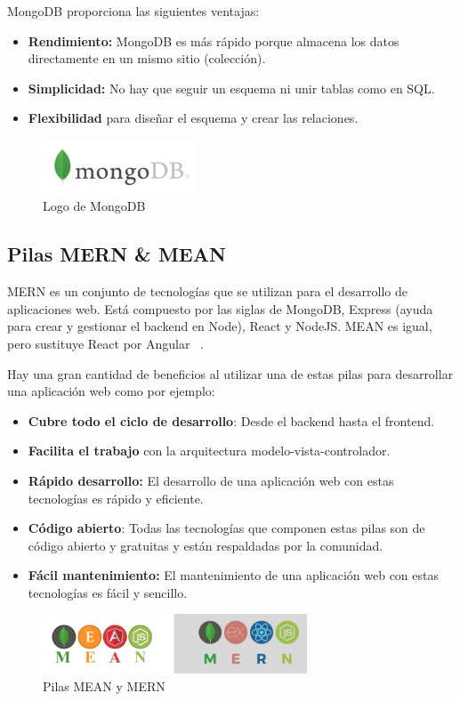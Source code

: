 MongoDB proporciona las siguientes ventajas:
\begin{itemize}
\item \textbf{Rendimiento:} MongoDB es más rápido porque almacena los datos directamente en un mismo sitio (colección).
\item \textbf{Simplicidad:} No hay que seguir un esquema ni unir tablas como en SQL.
\item  \textbf{Flexibilidad} para diseñar el esquema y crear las relaciones.
\end{itemize}
\begin{figure}[H]
    \centering
    \includegraphics[width=0.4\textwidth]{imagenes/c2/mongodb.png}
    \caption{Logo de MongoDB}
\end{figure}

\subsection{Pilas MERN \& MEAN}
MERN es un conjunto de tecnologías que se utilizan para el desarrollo de aplicaciones web. Está compuesto por las siglas de MongoDB, Express (ayuda para crear y gestionar el backend en Node), React y NodeJS. MEAN es igual, pero sustituye React por
Angular ~\cite{mern}.

Hay una gran cantidad de beneficios al utilizar una de estas pilas para desarrollar una aplicación web como por ejemplo:
\begin{itemize}
\item \textbf{Cubre todo el ciclo de desarrollo}: Desde el backend hasta el frontend.
\item \textbf{Facilita el trabajo} con la arquitectura modelo-vista-controlador.
\item \textbf{Rápido desarrollo:} El desarrollo de una aplicación web con estas tecnologías es rápido y eficiente.
\item \textbf{Código abierto}: Todas las tecnologías que componen estas pilas son de código abierto y gratuitas y están respaldadas por la comunidad.
\item \textbf{Fácil mantenimiento:} El mantenimiento de una aplicación web con estas tecnologías es fácil y sencillo.
\end{itemize}

\begin{figure}[H]
    \centering
    \includegraphics[width=0.7\textwidth]{imagenes/c2/MERN.png}
    \caption{Pilas MEAN y MERN}
\end{figure}

